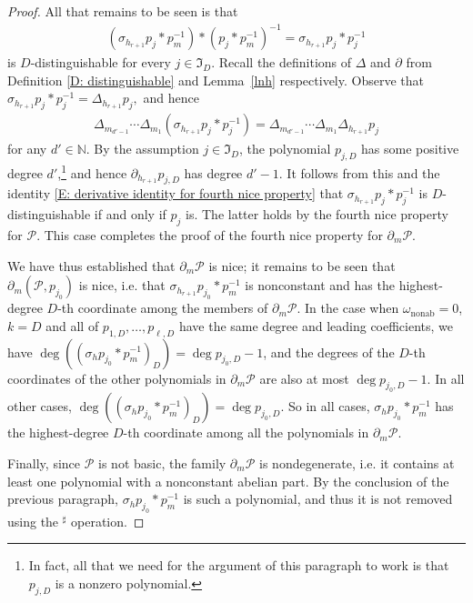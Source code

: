 \documentclass[11pt]{amsart}
\theoremstyle{definition}
\newcommand{\N}{{\mathbb N}}
\newcommand{\CP}{{\mathcal P}}
\newcommand{\FI}{{\mathfrak I}}
\newcommand{\inv}{^{-1}}
\newcommand{\1}{{\mathbf{1}}}
\newcommand{\nab}{{\mathrm{nonab}}}
\begin{document}
\begin{proof}
All that remains to be seen is that 
\begin{align*}
    (\sigma_{h_{r+1}}p_{j}\ast p_m^{-1})*(p_{j}*p_m\inv)^{-1}=\sigma_{h_{r+1}}p_{j}\ast p_{j}^{-1}
\end{align*}
is $D$-distinguishable for every $j\in \FI_D.$ Recall the definitions of $\Delta$ and $\partial$ from Definition \ref{D: distinguishable} and Lemma~\ref{lnh} respectively.
Observe that $\sigma_{h_{r+1}}p_{j}\ast p_{j}^{-1} = \Delta_{h_{r+1}}p_j,$
and hence
\begin{align}\label{E: derivative identity for fourth nice property}
    \Delta_{m_{d'-1}}\cdots \Delta_{m_{1}}(\sigma_{h_{r+1}}p_{j}\ast p_{j}^{-1}) = \Delta_{m_{d'-1}}\cdots \Delta_{m_{1}}\Delta_{h_{r+1}}p_j
\end{align}
 for any $d'\in\N$. By the assumption $j\in \FI_D$, the polynomial $p_{j,D}$ has some positive degree $d'$,\footnote{In fact, all that we need for the argument of this paragraph to work is that $p_{j,D}$ is a nonzero polynomial.} and hence $\partial_{h_{r+1}}p_{j,D}$ has degree $d'-1$. It follows from this and the identity \eqref{E: derivative identity for fourth nice property} that $\sigma_{h_{r+1}}p_{j}\ast p_{j}^{-1}$ is $D$-distinguishable if and only if $p_j$ is. The latter holds by the fourth nice property for $\CP$. This case completes the proof of the fourth nice property for $\partial_m \CP$. 


{We have thus established that $\partial_m \CP$ is nice; it remains to be seen that $\partial_m (\CP, p_{j_0})$ is nice, i.e. that $\sigma_{h_{r+1}}p_{j_0}*p_m\inv$ is nonconstant and has the highest-degree $D$-th coordinate among the members of $\partial_{m}\CP$. In the case when $\omega_\nab = 0$, $k=D$ and all of $p_{1,D},\dots,p_{\ell,D}$ have the same degree and leading coefficients, we have $\deg((\sigma_{h}p_{j_{0}}\ast p_{m}^{-1})_{D})=\deg p_{j_{0},D}-1$, and the degrees of the $D$-th coordinates of the other polynomials in  $\partial_{m}\CP$ are also at most $\deg p_{j_{0},D}-1$. In all other cases, $\deg((\sigma_{h}p_{j_{0}}\ast p_{m}^{-1})_{D})=\deg p_{j_{0},D}$. So in all cases, $\sigma_{h}p_{j_{0}}\ast p_{m}^{-1}$ has the highest-degree $D$-th coordinate among all the polynomials in $\partial_{m}\CP$.

Finally, since $\CP$ is not basic, the family $\partial_{m}\CP$ is {nondegenerate, i.e. it contains at least one polynomial with a nonconstant abelian part. By the conclusion of the previous paragraph, $\sigma_{h}p_{j_{0}}\ast p_{m}^{-1}$ is such a polynomial}, and thus it is not removed using the $^\sharp$ operation. }
\end{proof}
\end{document}
